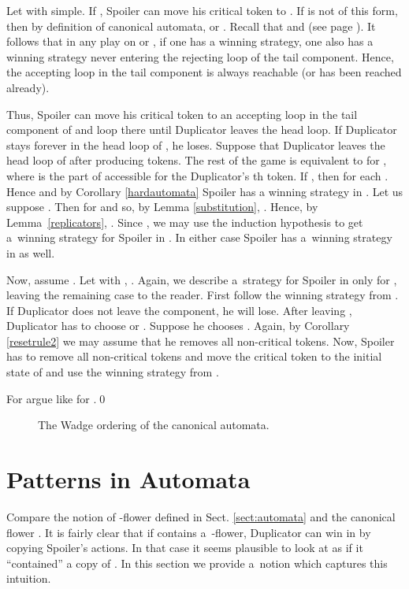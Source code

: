 \documentclass{LMCS}
\begin{document}
Let  with  simple. If , Spoiler can move his critical token to . If  is not of this form, then by definition of canonical automata,  or . Recall that  and  (see page \pageref{canonicalweakflowers}). It follows that in any play on  or , if one has a winning strategy, one also has a winning strategy never entering the rejecting loop of the tail component. Hence, the accepting loop in the tail component is always reachable (or has been reached already).  

 Thus, Spoiler can move his critical token to an accepting loop in the tail component of  and loop there until Duplicator leaves the head loop. If Duplicator stays forever in the head loop of , he loses. Suppose that Duplicator leaves the head loop of  after producing  tokens. The rest of the game is equivalent to  for , where  is the part of  accessible for the Duplicator's th token. If , then  for each . Hence  and by Corollary \ref{hardautomata} Spoiler has a winning strategy in . Let us suppose . Then  for  and so, by Lemma \ref{substitution},  . Hence, by Lemma~\ref{replicators}, . Since , we may use the induction hypothesis to get a~winning strategy for Spoiler in . In either case Spoiler has a~winning strategy in  as well.

 Now, assume . Let  with  , . Again, we describe a~strategy for Spoiler in  only for , leaving the remaining case to the reader. First follow the winning strategy from . If Duplicator does not leave the  component, he will lose. After leaving , Duplicator has to choose  or . Suppose he chooses . Again, by Corollary \ref{resetrule2} we may assume that he removes all non-critical tokens. Now, Spoiler has to remove all non-critical tokens and move the critical token to the initial state of  and use the winning strategy from . 

For  argue like for .\qed 



\begin{figure}
\centering
{\scriptsize {\setlength\arraycolsep{1pt}
}}
\caption{The Wadge ordering of the canonical automata.}
\label{fig:wadgecanonical}
\end{figure}


\section{Patterns in Automata} \label{patternsinautomata}

Compare the notion of -flower defined
in Sect. \ref{sect:automata} and the canonical flower . It is fairly clear that if  contains
a~-flower, Duplicator can win in  by copying Spoiler's actions. In that case it seems plausible to
look at  as if it ``contained'' a copy of . In this section we provide a~notion which captures this intuition.
\end{document}
